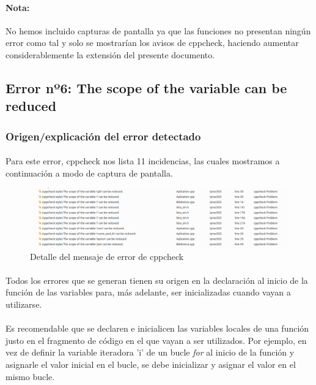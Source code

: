 			\paragraph{Nota:}No hemos incluido capturas de pantalla ya que las funciones no presentan ningún error como tal y solo se mostrarían los avisos de cppcheck, haciendo aumentar considerablemente la extensión del presente documento.
			
	\subsection{Error nº6: The scope of the variable can be reduced}
	
		\subsubsection{Origen/explicación del error detectado}
		
			\paragraph{}Para este error, cppcheck nos lista 11 incidencias, las cuales mostramos a continuación a modo de captura de pantalla.
			
			\begin{figure}[H]
				\centering
				\includegraphics[scale=0.38]{img/captura63.png}
				\caption{Detalle del mensaje de error de cppcheck}
				\label{captura63}
			\end{figure}
		
			\paragraph{}Todos los errores que se generan tienen su origen en la declaración al inicio de la función de las variables para, más adelante, ser inicializadas cuando vayan a utilizarse.
			
			\paragraph{}Es recomendable que se declaren e inicialicen las variables locales de una función justo en el fragmento de código en el que vayan a ser utilizados. Por ejemplo, en vez de definir la variable iteradora 'i' de un bucle \textit{for} al inicio de la función y asignarle el valor inicial en el bucle, se debe inicializar y asignar el valor en el mismo bucle.
			
